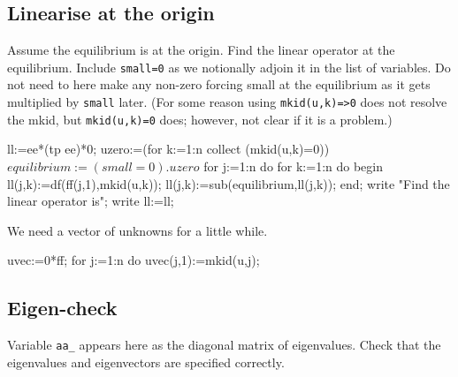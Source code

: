 \documentclass[11pt,a5paper]{article}
\begin{document}
\subsection{Linearise at the origin}

Assume the equilibrium is at the origin. Find the linear
operator at the equilibrium.  Include \verb|small=0| as we
notionally adjoin it in the list of variables.  Do not need
to here make any non-zero forcing small at the equilibrium
as it gets multiplied by \verb|small| later.  (For some
reason using \verb|mkid(u,k)=>0| does not resolve the mkid,
but \verb|mkid(u,k)=0| does; however, not clear if it is a
problem.)
\begin{reduce}
ll:=ee*(tp ee)*0; %
uzero:=(for k:=1:n collect (mkid(u,k)=0))$
equilibrium:=(small=0).uzero$
for j:=1:n do for k:=1:n do begin 
  ll(j,k):=df(ff(j,1),mkid(u,k));
  ll(j,k):=sub(equilibrium,ll(j,k));
end;
write "Find the linear operator is";
write ll:=ll;
\end{reduce}

We need a vector of unknowns for a little while.
\begin{reduce}
uvec:=0*ff; %
for j:=1:n do uvec(j,1):=mkid(u,j);
\end{reduce}



\subsection{Eigen-check}

Variable \verb|aa_| appears here as the diagonal matrix of
eigenvalues. Check that the eigenvalues and eigenvectors are
specified correctly.
\end{document}
